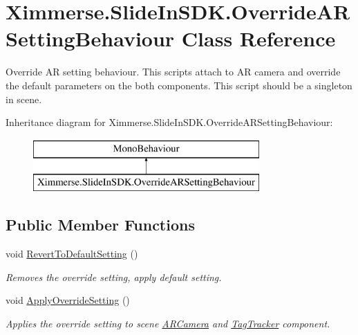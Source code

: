 \hypertarget{class_ximmerse_1_1_slide_in_s_d_k_1_1_override_a_r_setting_behaviour}{}\section{Ximmerse.\+Slide\+In\+S\+D\+K.\+Override\+A\+R\+Setting\+Behaviour Class Reference}
\label{class_ximmerse_1_1_slide_in_s_d_k_1_1_override_a_r_setting_behaviour}


Override AR setting behaviour. This scripts attach to AR camera and override the default parameters on the both components. This script should be a singleton in scene.  


Inheritance diagram for Ximmerse.\+Slide\+In\+S\+D\+K.\+Override\+A\+R\+Setting\+Behaviour\+:\begin{figure}[H]
\begin{center}
\leavevmode
\includegraphics[height=2.000000cm]{class_ximmerse_1_1_slide_in_s_d_k_1_1_override_a_r_setting_behaviour}
\end{center}
\end{figure}
\subsection*{Public Member Functions}
\begin{DoxyCompactItemize}
\item 
void \mbox{\hyperlink{class_ximmerse_1_1_slide_in_s_d_k_1_1_override_a_r_setting_behaviour_a969cf885fa002292bffff6468d6704b4}{Revert\+To\+Default\+Setting}} ()
\begin{DoxyCompactList}\small\item\em Removes the override setting, apply default setting. \end{DoxyCompactList}\item 
void \mbox{\hyperlink{class_ximmerse_1_1_slide_in_s_d_k_1_1_override_a_r_setting_behaviour_af951092941f5e3c916ef4e4f358cb4ff}{Apply\+Override\+Setting}} ()
\begin{DoxyCompactList}\small\item\em Applies the override setting to scene \mbox{\hyperlink{class_ximmerse_1_1_slide_in_s_d_k_1_1_a_r_camera}{A\+R\+Camera}} and \mbox{\hyperlink{class_ximmerse_1_1_slide_in_s_d_k_1_1_tag_tracker}{Tag\+Tracker}} component. \end{DoxyCompactList}\end{DoxyCompactItemize}
